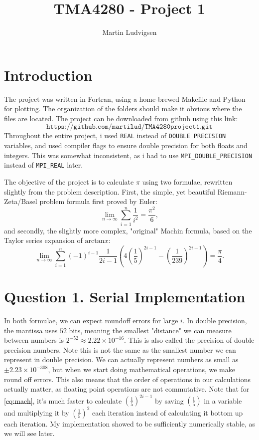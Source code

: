 \documentclass[12pt]{article}
\author{Martin Ludvigsen}
\title{TMA4280 - Project 1}
\begin{document}
\maketitle
\section{Introduction}
The project was written in Fortran, using a home-brewed Makefile and Python for plotting. The organization of the folders
should make it obvious where the files are located. The project can be downloaded from github using this link:
\begin{equation*}
    \texttt{https://github.com/martilud/TMA4280project1.git}
\end{equation*}
Throughout the entire project, i used \texttt{REAL} instead of \texttt{DOUBLE PRECISION} variables, and used compiler flags to ensure double precision for both floats and integers.
This was somewhat inconsistent, as i had to use \texttt{MPI\_DOUBLE\_PRECISION} instead of \texttt{MPI\_REAL} later.

The objective of the project is to calculate $\pi$ using two formulae, rewritten slightly from the problem description. First, the simple, yet beautiful Riemann-Zeta/Basel problem formula
first proved by Euler:
\begin{equation}
    \lim_{n \rightarrow \infty} \sum_{i = 1}^n \frac{1}{i^2} = \frac{\pi^2}{6},
    \label{eq:zeta}
\end{equation}
and secondly, the slightly more complex, "original" Machin formula, based on the Taylor series expansion of $\text{arctan} x$:
\begin{equation}
    \lim_{n \rightarrow \infty} \sum_{i = 1}^n (-1)^{i-1} \frac{1}{2i-1}\left(4 \left(\frac{1}{5}\right)^{2i-1} - \left(\frac{1}{239}\right)^{2i-1}\right) = \frac{\pi}{4}.
    \label{eq:mach}
\end{equation}

\section{Question 1. Serial Implementation}
In both formulae, we can expect roundoff errors for large $i$. In double precision, the mantissa uses $52$ bits, meaning the smallest "distance" we can measure
between numbers is $2^{-52} \approx 2.22 \times 10^{-16}$. This is also called the precision of double precision numbers.
Note this is not the same as the smallest number we can represent in double precision. We can actually represent numbers as small as
$\pm 2.23 \times 10^{-308}$, but when we start doing mathematical operations, we make round off errors. 
This also means that the order of operations in our calculations actually matter, as floating point operations are not commutative.
Note that for \eqref{eq:mach}, it's much faster to calculate $\left(\frac{1}{5}\right)^{2i-1}$ by saving $\left(\frac{1}{5}\right)$ in a variable and multiplying it by 
$\left(\frac{1}{5}\right)^2$ each iteration instead of calculating it bottom up each iteration.
My implementation showed to be sufficiently numerically stable, as we will see later. 
\end{document}
